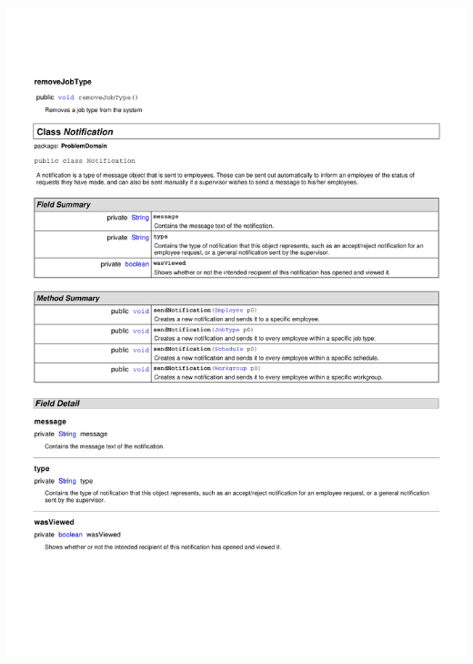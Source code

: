 \documentclass[letterpaper,12pt]{report}
\begin{document}
\includegraphics[scale=0.9,trim=20mm 30mm 25mm 25mm]{externals/ProblemDomainDataDictionary6.pdf}
\newpage
\end{document}
